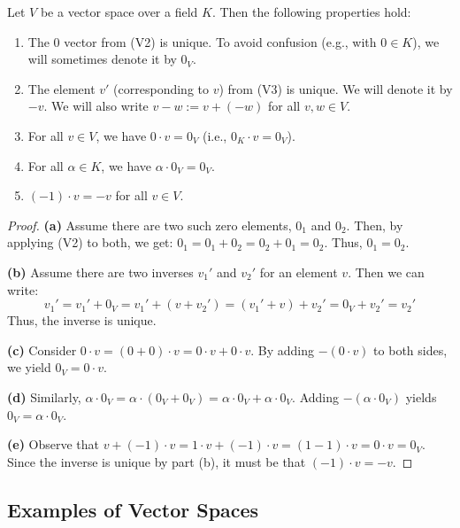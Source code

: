 \begin{lemma}
Let $V$ be a vector space over a field $K$. Then the following properties hold:
\begin{enumerate}
    \item The $0$ vector from (V2) is unique. To avoid confusion (e.g., with $0 \in K$), we will sometimes denote it by $0_V$.
    \item The element $v'$ (corresponding to $v$) from (V3) is unique. We will denote it by $-v$. We will also write $v - w := v + (-w)$ for all $v, w \in V$.
    \item For all $v \in V$, we have $0 \cdot v = 0_V$ (i.e., $0_K \cdot v = 0_V$).
    \item For all $\alpha \in K$, we have $\alpha \cdot 0_V = 0_V$.
    \item $(-1) \cdot v = -v$ for all $v \in V$.
\end{enumerate}
\end{lemma}

\begin{proof}
\textbf{(a)} Assume there are two such zero elements, $0_1$ and $0_2$. 
Then, by applying (V2) to both, we get: $0_1 = 0_1 + 0_2 = 0_2 + 0_1 = 0_2$. Thus, $0_1 = 0_2$.

\textbf{(b)} Assume there are two inverses $v_1'$ and $v_2'$ for an element $v$. 
Then we can write: 
\[
v_1' = v_1' + 0_V = v_1' + (v + v_2') = (v_1' + v) + v_2' = 0_V + v_2' = v_2'
\]
Thus, the inverse is unique.

\textbf{(c)} Consider $0 \cdot v = (0 + 0) \cdot v = 0 \cdot v + 0 \cdot v$. 
By adding $-(0 \cdot v)$ to both sides, we yield $0_V = 0 \cdot v$.

\textbf{(d)} Similarly, $\alpha \cdot 0_V = \alpha \cdot (0_V + 0_V) = \alpha \cdot 0_V + \alpha \cdot 0_V$. Adding $-(\alpha \cdot 0_V)$ yields $0_V = \alpha \cdot 0_V$.

\textbf{(e)} Observe that $v + (-1) \cdot v = 1 \cdot v + (-1) \cdot v = (1 - 1) \cdot v = 0 \cdot v = 0_V$. Since the inverse is unique by part (b), it must be that $(-1) \cdot v = -v$.
\end{proof}

\subsection{Examples of Vector Spaces}

